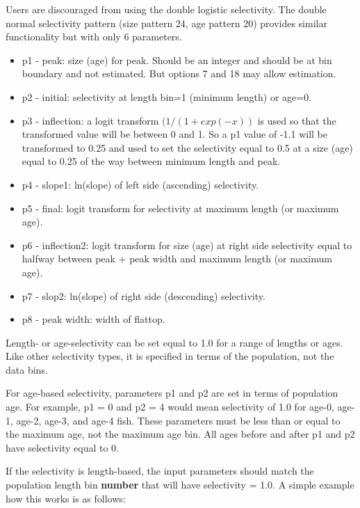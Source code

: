 \hypertarget{DoubleLogSelectivity}{}
Users are discouraged from using the double logistic selectivity. The double normal selectivity pattern (size pattern 24, age pattern 20) provides similar functionality but with only 6 parameters.
	\begin{itemize}
		\item p1 - peak: size (age) for peak. Should be an integer and should be at bin boundary and not estimated. But options 7 and 18 may allow estimation.
		\item p2 - initial: selectivity at length bin=1 (minimum length) or age=0.
		\item p3 - inflection: a logit transform $(1/(1+exp(-x))$ is used so that the transformed value will be between 0 and 1. So a p1 value of -1.1 will be transformed to 0.25 and used to set the selectivity equal to 0.5 at a size (age) equal to 0.25 of the way between minimum length and peak. 
		\item p4 - slope1: ln(slope) of left side (ascending) selectivity.
		\item p5 - final: logit transform for selectivity at maximum length (or maximum age).
		\item p6 - inflection2: logit transform for size (age) at right side selectivity equal to halfway between peak + peak width and maximum length (or maximum age).
		\item p7 - slop2: ln(slope) of right side (descending) selectivity.
		\item p8 - peak width: width of flattop.
	\end{itemize}

\hypertarget{SelectivityOneRange}{}
Length- or age-selectivity can be set equal to 1.0 for a range of lengths or ages. Like other selectivity types, it is specified in terms of the population, not the data bins.

For age-based selectivity, parameters p1 and p2 are set in terms of population age. For example, p1 = 0 and p2 = 4 would mean selectivity of 1.0 for age-0, age-1, age-2, age-3, and age-4 fish. These parameters must be less than or equal to the maximum age, not the maximum age bin. All ages before and after p1 and p2 have selectivity equal to 0.

If the selectivity is length-based, the input parameters should match the population length bin \textbf{number} that will have selectivity = 1.0. A simple example how this works is as follows:

